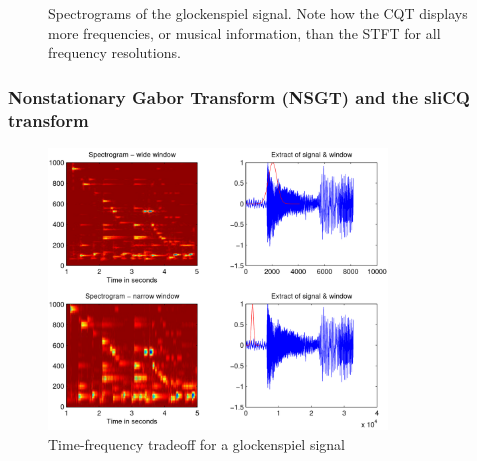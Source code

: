 \documentclass[report.tex]{subfiles}
\begin{document}
\begin{figure}[ht]
	\caption{Spectrograms of the glockenspiel signal. Note how the CQT displays more frequencies, or musical information, than the STFT for all frequency resolutions.}
	\label{fig:cqtvstft}
\end{figure}

\newpagefill

\subsubsection{Nonstationary Gabor Transform (NSGT) and the sliCQ transform}
\label{sec:theorynsgt}


\begin{figure}[ht]
	\centering
	\includegraphics[width=9cm]{./images-tftheory/tf_tradeoff_dorfler.png}
	\caption{Time-frequency tradeoff for a glockenspiel signal}
	\label{fig:dorflertradeoff}
\end{figure}
\end{document}
